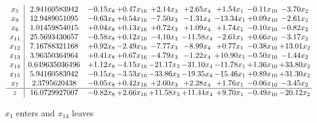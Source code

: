 \documentclass[9pt]{article}
\begin{document}
 \[\begin{array}{c| c c@{\hskip 2pt} c@{\hskip 2pt} c@{\hskip 2pt} c@{\hskip 2pt} c@{\hskip 2pt} c@{\hskip 2pt} c@{\hskip 2pt} }
 x_{5}   &  2.94160583942 & -0.15 x_{8} & +  0.47 x_{16} & +  2.14 x_{3} & +  2.65 x_{4} & +  1.54 x_{1} & -0.11 x_{10} & -3.70 x_{2}\\
 x_{9}   &  12.9489051095 & -0.63 x_{8} & +  0.54 x_{16} & -7.50 x_{3} & -1.31 x_{4} & -13.34 x_{1} & +  0.09 x_{10} & -2.61 x_{2}\\
 x_{6}   &  1.01459854015 & +  0.04 x_{8} & +  0.13 x_{16} & +  0.72 x_{3} & +  1.09 x_{4} & +  1.74 x_{1} & -0.10 x_{10} & -0.82 x_{2}\\
 x_{11}   &  25.5693430657 & -0.58 x_{8} & +  0.12 x_{16} & -4.10 x_{3} & -11.58 x_{4} & -2.61 x_{1} & +  0.66 x_{10} & -3.17 x_{2}\\
 x_{12}   &  7.16788321168 & +  0.92 x_{8} & -2.49 x_{16} & -7.77 x_{3} & -8.99 x_{4} & +  0.77 x_{1} & -0.38 x_{10} & + 13.01 x_{2}\\
 x_{13}   &  3.96350364964 & +  0.41 x_{8} & +  0.67 x_{16} & -4.79 x_{3} & -1.22 x_{4} & + 10.90 x_{1} & -0.50 x_{10} & -1.44 x_{2}\\
 x_{14}   &  0.649635036496 & +  1.12 x_{8} & -4.15 x_{16} & -21.17 x_{3} & -31.10 x_{4} & -11.78 x_{1} & +  1.36 x_{10} & + 33.80 x_{2}\\
 x_{15}   &  5.94160583942 & -0.15 x_{8} & -3.53 x_{16} & -33.86 x_{3} & -19.35 x_{4} & -15.46 x_{1} & +  0.89 x_{10} & + 31.30 x_{2}\\
 x_{7}   &  2.3795620438 & -0.05 x_{8} & +  0.42 x_{16} & +  2.60 x_{3} & +  2.28 x_{4} & +  1.76 x_{1} & -0.06 x_{10} & -3.45 x_{2}\\
\hline
z    &  16.0729927007 & -0.82 x_{8} & +  2.66 x_{16} & + 11.58 x_{3} & + 11.44 x_{4} & +  9.70 x_{1} & -0.49 x_{10} & -20.12 x_{2}\\
\end{array}\]


 $ x_{1} $ enters and $ x_{14} $ leaves 
\end{document}
